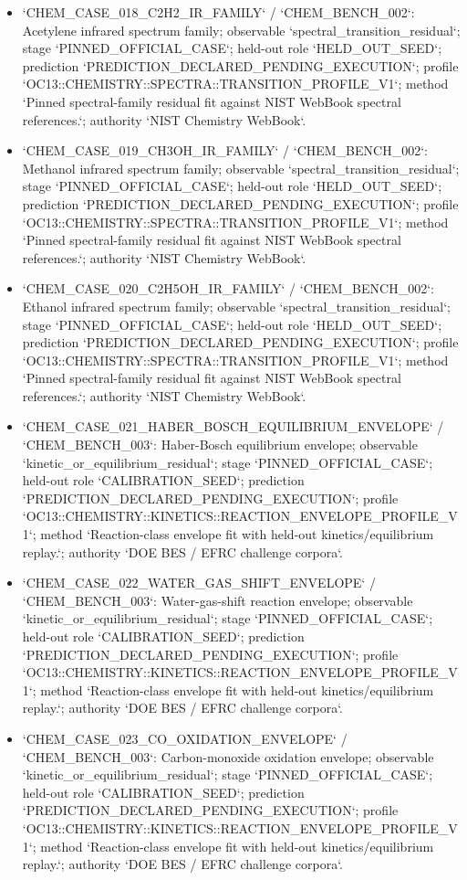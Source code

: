 \begin{itemize}
\item `CHEM\_CASE\_018\_C2H2\_IR\_FAMILY` / `CHEM\_BENCH\_002`: Acetylene infrared spectrum family; observable `spectral\_transition\_residual`; stage `PINNED\_OFFICIAL\_CASE`; held-out role `HELD\_OUT\_SEED`; prediction `PREDICTION\_DECLARED\_PENDING\_EXECUTION`; profile `OC13::CHEMISTRY::SPECTRA::TRANSITION\_PROFILE\_V1`; method `Pinned spectral-family residual fit against NIST WebBook spectral references.`; authority `NIST Chemistry WebBook`.
\item `CHEM\_CASE\_019\_CH3OH\_IR\_FAMILY` / `CHEM\_BENCH\_002`: Methanol infrared spectrum family; observable `spectral\_transition\_residual`; stage `PINNED\_OFFICIAL\_CASE`; held-out role `HELD\_OUT\_SEED`; prediction `PREDICTION\_DECLARED\_PENDING\_EXECUTION`; profile `OC13::CHEMISTRY::SPECTRA::TRANSITION\_PROFILE\_V1`; method `Pinned spectral-family residual fit against NIST WebBook spectral references.`; authority `NIST Chemistry WebBook`.
\item `CHEM\_CASE\_020\_C2H5OH\_IR\_FAMILY` / `CHEM\_BENCH\_002`: Ethanol infrared spectrum family; observable `spectral\_transition\_residual`; stage `PINNED\_OFFICIAL\_CASE`; held-out role `HELD\_OUT\_SEED`; prediction `PREDICTION\_DECLARED\_PENDING\_EXECUTION`; profile `OC13::CHEMISTRY::SPECTRA::TRANSITION\_PROFILE\_V1`; method `Pinned spectral-family residual fit against NIST WebBook spectral references.`; authority `NIST Chemistry WebBook`.
\item `CHEM\_CASE\_021\_HABER\_BOSCH\_EQUILIBRIUM\_ENVELOPE` / `CHEM\_BENCH\_003`: Haber-Bosch equilibrium envelope; observable `kinetic\_or\_equilibrium\_residual`; stage `PINNED\_OFFICIAL\_CASE`; held-out role `CALIBRATION\_SEED`; prediction `PREDICTION\_DECLARED\_PENDING\_EXECUTION`; profile `OC13::CHEMISTRY::KINETICS::REACTION\_ENVELOPE\_PROFILE\_V1`; method `Reaction-class envelope fit with held-out kinetics/equilibrium replay.`; authority `DOE BES / EFRC challenge corpora`.
\item `CHEM\_CASE\_022\_WATER\_GAS\_SHIFT\_ENVELOPE` / `CHEM\_BENCH\_003`: Water-gas-shift reaction envelope; observable `kinetic\_or\_equilibrium\_residual`; stage `PINNED\_OFFICIAL\_CASE`; held-out role `CALIBRATION\_SEED`; prediction `PREDICTION\_DECLARED\_PENDING\_EXECUTION`; profile `OC13::CHEMISTRY::KINETICS::REACTION\_ENVELOPE\_PROFILE\_V1`; method `Reaction-class envelope fit with held-out kinetics/equilibrium replay.`; authority `DOE BES / EFRC challenge corpora`.
\item `CHEM\_CASE\_023\_CO\_OXIDATION\_ENVELOPE` / `CHEM\_BENCH\_003`: Carbon-monoxide oxidation envelope; observable `kinetic\_or\_equilibrium\_residual`; stage `PINNED\_OFFICIAL\_CASE`; held-out role `CALIBRATION\_SEED`; prediction `PREDICTION\_DECLARED\_PENDING\_EXECUTION`; profile `OC13::CHEMISTRY::KINETICS::REACTION\_ENVELOPE\_PROFILE\_V1`; method `Reaction-class envelope fit with held-out kinetics/equilibrium replay.`; authority `DOE BES / EFRC challenge corpora`.

\end{itemize}
